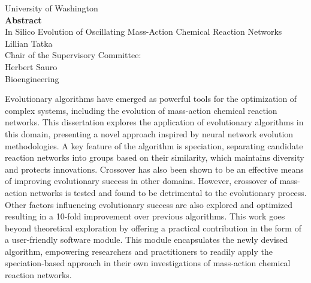 \documentclass[12pt]{report}
\begin{document}
\begin{center}
University of Washington\\
\vspace*{\fill}
\textbf{Abstract} \\
\vspace*{\fill}
In Silico Evolution of Oscillating Mass-Action Chemical Reaction Networks\\
\vspace*{\fill}
Lillian Tatka\\
\vspace*{\fill}
Chair of the Supervisory Committee:\\
Herbert Sauro\\
Bioengineering
\end{center}
\vspace*{\fill}
Evolutionary algorithms have emerged as powerful tools for the optimization of complex systems, including the evolution of mass-action chemical reaction networks. This dissertation explores the application of evolutionary algorithms in this domain, presenting a novel approach inspired by neural network evolution methodologies. A key feature of the algorithm is speciation, separating candidate reaction networks into groups based on their similarity, which maintains diversity and protects innovations. Crossover has also been shown to be an effective means of improving evolutionary success in other domains. However, crossover of mass-action networks is tested and found to be detrimental to the evolutionary process. Other factors influencing evolutionary success are also explored and optimized resulting in a 10-fold improvement over previous algorithms. This work goes beyond theoretical exploration by offering a practical contribution in the form of a user-friendly software module. This module encapsulates the newly devised algorithm, empowering researchers and practitioners to readily apply the speciation-based approach in their own investigations of mass-action chemical reaction networks.


\tableofcontents

\listoffigures

\listoftables
\end{document}
